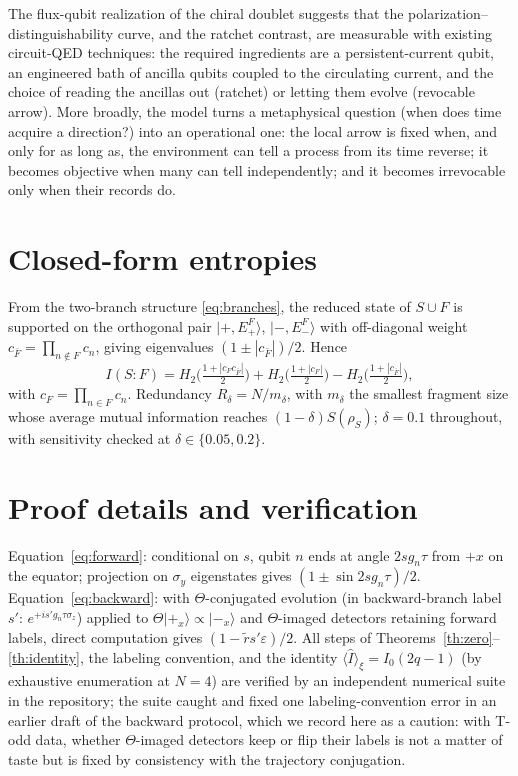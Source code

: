 \documentclass[11pt]{article}
\newcommand{\Iop}{\hat{I}}
\begin{document}
The flux-qubit realization of the chiral doublet \cite{Friedman2000} suggests that the polarization--distinguishability curve, and the ratchet contrast, are measurable with existing circuit-QED techniques: the required ingredients are a persistent-current qubit, an engineered bath of ancilla qubits coupled to the circulating current, and the choice of reading the ancillas out (ratchet) or letting them evolve (revocable arrow). More broadly, the model turns a metaphysical question (when does time acquire a direction?) into an operational one: the local arrow is fixed when, and only for as long as, the environment can tell a process from its time reverse; it becomes objective when many can tell independently; and it becomes irrevocable only when their records do.

\appendix

\section{Closed-form entropies}\label{app:entropies}
From the two-branch structure \eqref{eq:branches}, the reduced state of $S\cup F$ is supported on the orthogonal pair $|{+},E_+^F\rangle$, $|{-},E_-^F\rangle$ with off-diagonal weight $c_{\bar F}=\prod_{n\notin F}c_n$, giving eigenvalues $(1\pm|c_{\bar F}|)/2$. Hence
\begin{equation}
I(S{:}F) = H_2\!\Big(\tfrac{1+|c_Fc_{\bar F}|}{2}\Big) + H_2\!\Big(\tfrac{1+|c_F|}{2}\Big) - H_2\!\Big(\tfrac{1+|c_{\bar F}|}{2}\Big),
\end{equation}
with $c_F=\prod_{n\in F}c_n$. Redundancy $R_\delta = N/m_\delta$, with $m_\delta$ the smallest fragment size whose average mutual information reaches $(1-\delta)S(\rho_S)$; $\delta=0.1$ throughout, with sensitivity checked at $\delta\in\{0.05,0.2\}$.

\section{Proof details and verification}\label{app:proofs}
Equation~\eqref{eq:forward}: conditional on $s$, qubit $n$ ends at angle $2sg_n\tau$ from $+x$ on the equator; projection on $\sigma_y$ eigenstates gives $(1\pm\sin 2sg_n\tau)/2$. Equation~\eqref{eq:backward}: with $\Theta$-conjugated evolution (in backward-branch label $s'$: $e^{+is'g_n\tau\sigma_z}$) applied to $\Theta|+_x\rangle\propto|-_x\rangle$ and $\Theta$-imaged detectors retaining forward labels, direct computation gives $(1-\tilde r s'\varepsilon)/2$. All steps of Theorems~\ref{th:zero}--\ref{th:identity}, the labeling convention, and the identity $\langle\Iop\rangle_\xi=I_0(2q-1)$ (by exhaustive enumeration at $N=4$) are verified by an independent numerical suite in the repository; the suite caught and fixed one labeling-convention error in an earlier draft of the backward protocol, which we record here as a caution: with T-odd data, whether $\Theta$-imaged detectors keep or flip their labels is not a matter of taste but is fixed by consistency with the trajectory conjugation.
\end{document}
